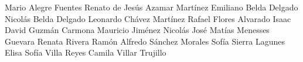 Mario Alegre Fuentes
Renato de Jesús Azamar Martínez
Emiliano Belda Delgado
Nicolás Belda Delgado
Leonardo Chávez Martínez
Rafael Flores Alvarado
Isaac David Guzmán Carmona
Mauricio Jiménez Nicolás
José Matías Menesses Guevara
Renata Rivera Ramón
Alfredo Sánchez Morales
Sofía Sierra Lagunes
Elisa Sofía Villa Reyes
Camila Villar Trujillo

